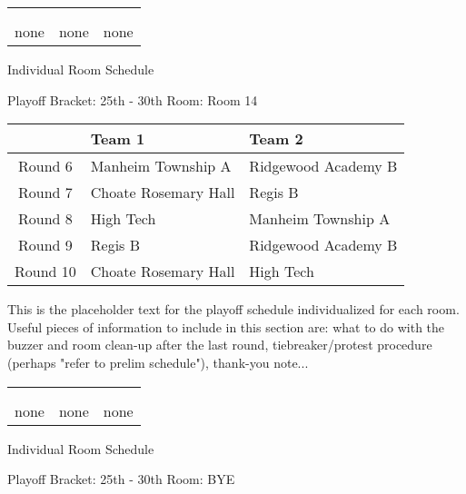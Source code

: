 \documentclass{article}%
\begin{document}
%
\begin{tabularx}{\textwidth}{YYY}%
  &  &  \\%
\\%
none&none&none\\%
\end{tabularx}%
\newpage%
\begin{center}%
\begin{Huge}%
Individual Room Schedule%
\end{Huge}%
\vspace*{16pt}%
\linebreak%
\begin{Large}%
Playoff Bracket: 25th - 30th \hfill Room: Room 14%
\end{Large}%
\end{center}%
%
\begin{tabularx}{\textwidth}{|c|Y|Y|}%
\hline%
&Team 1&Team 2\\%
\hline%
Round 6&Manheim Township A&Ridgewood Academy B\\%
Round 7&Choate Rosemary Hall&Regis B\\%
Round 8&High Tech&Manheim Township A\\%
Round 9&Regis B&Ridgewood Academy B\\%
Round 10&Choate Rosemary Hall&High Tech\\%
\hline%
\end{tabularx}%
\vspace*{16pt}%
\linebreak%
This is the placeholder text for the playoff schedule individualized for each room. Useful pieces of information to include in this section are: what to do with the buzzer and room clean{-}up after the last round, tiebreaker/protest procedure (perhaps "refer to prelim schedule"), thank{-}you note...%
\vspace*{30pt}%
\newline%
%
\begin{tabularx}{\textwidth}{YYY}%
  &  &  \\%
\\%
none&none&none\\%
\end{tabularx}%
\newpage%
\begin{center}%
\begin{Huge}%
Individual Room Schedule%
\end{Huge}%
\vspace*{16pt}%
\linebreak%
\begin{Large}%
Playoff Bracket: 25th - 30th \hfill Room: BYE%
\end{Large}%
\end{center}%
\end{document}
